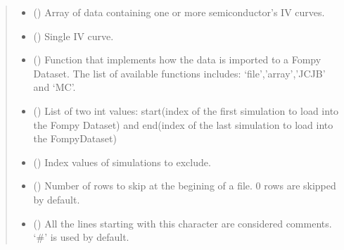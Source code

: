 \documentclass[letterpaper,10pt,english,openany, oneside]{sphinxmanual}
\begin{document}
\begin{fulllineitems}
\begin{fulllineitems}
\begin{quote}
\begin{description}
\begin{itemize}
\item {} 
 () \textendash{} Array of data containing one or more semiconductor’s IV curves.

\item {} 
 () \textendash{} Single IV curve.

\item {} 
 () \textendash{} Function that implements how the data is imported to a Fompy Dataset. The list of available functions includes:
‘file’,’array’,’JCJB’ and ‘MC’.

\item {} 
 () \textendash{} List of two int values: start(index of the first simulation to load into the Fompy Dataset)
and end(index of the last simulation to load into the FompyDataset)

\item {} 
 () \textendash{} Index values of simulations to exclude.

\item {} 
 () \textendash{} Number of rows to skip at the begining of a file. 0 rows are skipped by default.

\item {} 
 () \textendash{} All the lines starting with this character are considered comments.
‘\#’ is used by default.

\end{itemize}

\end{description}\end{quote}

\end{fulllineitems}


\end{fulllineitems}

\end{document}
